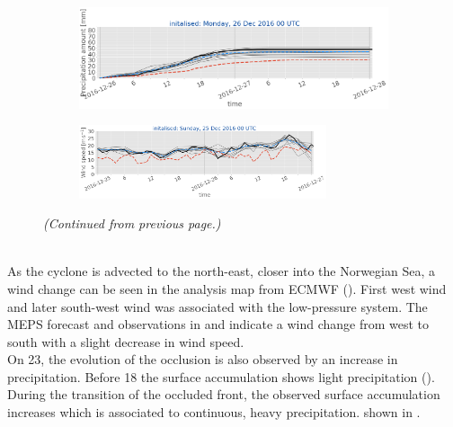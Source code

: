 \begin{figure}[H]
	\begin{subfigure}[b]{0.49\textwidth}
		\includegraphics[trim={0.cm 3.6cm 0cm 0cm},clip,
		width=\textwidth]{./fig_sfc_precip/20161226_00}
		\caption{}\label{fig:res:sfc_precip26}
	\end{subfigure}
	
	\begin{subfigure}[b]{\textwidth}
		\centering
		\includegraphics[trim={5.5cm 0cm 5.cm 17.2cm},clip,
		width=0.8\textwidth]{./fig_sfc_ws/20161225_00}
	\end{subfigure}
	\caption{\textit{(Continued from previous page.)} }
\end{figure}
\noindent
\\
As the cyclone is advected to the north-east, closer into the Norwegian Sea, a wind change can be seen in the analysis map from ECMWF (). First west wind and later south-west wind was associated with the low-pressure system. The MEPS forecast and observations in  and  indicate a wind change from west to south with a slight decrease in wind speed.
\\
On \SI{23}{\dec}, the evolution of the occlusion is also observed by an increase in precipitation. Before \SI{18}{\UTC} the surface accumulation shows light precipitation (). During the transition of the occluded front, the observed surface accumulation increases which is associated to continuous, heavy precipitation.  shown in .
\\
\\
